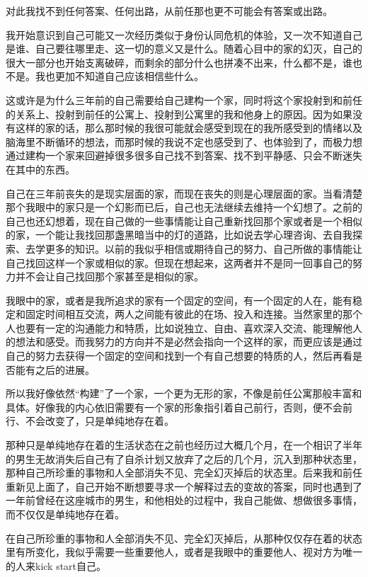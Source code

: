 对此我找不到任何答案、任何出路，从前任那也更不可能会有答案或出路。

我开始意识到自己可能又一次经历类似于身份认同危机的体验，又一次不知道自己是谁、自己要往哪里走、这一切的意义又是什么。随着心目中的家的幻灭，自己的很大一部分也开始支离破碎，而剩余的部分什么也拼凑不出来，什么都不是，谁也不是。我也更加不知道自己应该相信些什么。

这或许是为什么三年前的自己需要给自己建构一个家，同时将这个家投射到和前任的关系上、投射到前任的公寓上、投射到公寓里的我和他身上的原因。因为如果没有这样的家的话，那么那时候的我很可能就会感受到现在的我所感受到的情绪以及脑海里不断循环的想法，而那时候的我说不定也感受到了、也体验到了，而极力想通过建构一个家来回避掉很多很多自己找不到答案、找不到平静感、只会不断迷失在其中的东西。

自己在三年前丧失的是现实层面的家，而现在丧失的则是心理层面的家。当看清楚那个我眼中的家只是一个幻影而已后，自己也无法继续去维持一个幻想了。之前的自己也还幻想着，现在自己做的一些事情能让自己重新找回那个家或者是一个相似的家，一个能让我找回那盏黑暗当中的灯的道路，比如说去学心理咨询、去自我探索、去学更多的知识。以前的我似乎相信或期待自己的努力、自己所做的事情能让自己找回这样一个家或相似的家。但现在想起来，这两者并不是同一回事\pozhehao{}自己的努力并不会让自己找回那个家甚至是相似的家。

我眼中的家，或者是我所追求的家有一个固定的空间，有一个固定的人在，能有稳定和固定时间相互交流，两人之间能有彼此的在场、投入和连接。当然家里的那个人也要有一定的沟通能力和特质，比如说独立、自由、喜欢深入交流、能理解他人的想法和感受。而我努力的方向并不是必然会指向一个这样的家，而更应该是通过自己的努力去获得一个固定的空间和找到一个有自己想要的特质的人，然后再看是否能有之后的进展。

所以我好像依然“构建”了一个家，一个更为无形的家，不像是前任公寓那般丰富和具体。好像我的内心依旧需要有一个家的形象指引着自己前行，否则，便不会前行、不会改变了，只是单纯地存在着。

那种只是单纯地存在着的生活状态在之前也经历过大概几个月，在一个相识了半年的男生无故消失后自己有了自杀计划又放弃了之后的几个月，沉入到那种状态里，那种自己所珍重的事物和人全部消失不见、完全幻灭掉后的状态里。后来我和前任重新见上面了，自己开始不断想要寻求一个解释过去的变故的答案，同时也遇到了一年前曾经在这座城市的男生，和他相处的过程中，我自己能做、想做很多事情，而不仅仅是单纯地存在着。

在自己所珍重的事物和人全部消失不见、完全幻灭掉后，从那种仅仅存在着的状态里有所变化，我似乎需要一些重要他人，或者是我眼中的重要他人、视对方为唯一的人来kick start自己。


